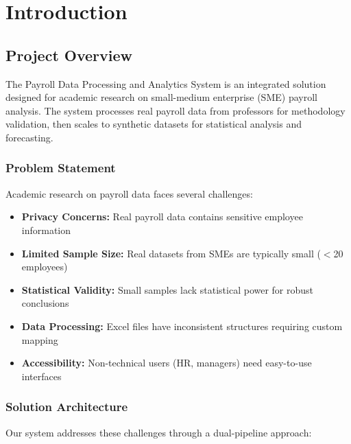 \chapter{Introduction}

\section{Project Overview}

The Payroll Data Processing and Analytics System is an integrated solution designed for academic research on small-medium enterprise (SME) payroll analysis. The system processes real payroll data from professors for methodology validation, then scales to synthetic datasets for statistical analysis and forecasting.

\subsection{Problem Statement}

Academic research on payroll data faces several challenges:

\begin{itemize}
    \item \textbf{Privacy Concerns:} Real payroll data contains sensitive employee information
    \item \textbf{Limited Sample Size:} Real datasets from SMEs are typically small ($<$20 employees)
    \item \textbf{Statistical Validity:} Small samples lack statistical power for robust conclusions
    \item \textbf{Data Processing:} Excel files have inconsistent structures requiring custom mapping
    \item \textbf{Accessibility:} Non-technical users (HR, managers) need easy-to-use interfaces
\end{itemize}

\subsection{Solution Architecture}

Our system addresses these challenges through a dual-pipeline approach:

